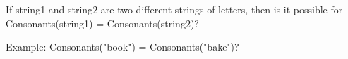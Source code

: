 \documentclass{ximera}
\begin{document}
\begin{exercise}

If string1 and string2 are two different strings of letters, then is it possible for Consonants(string1) = Consonants(string2)?

  \begin{multipleChoice}
  \end{multipleChoice}
  \begin{feedback}
Example: Consonants("book") = Consonants("bake")?
  \end{feedback}
\end{exercise}
\end{document}
